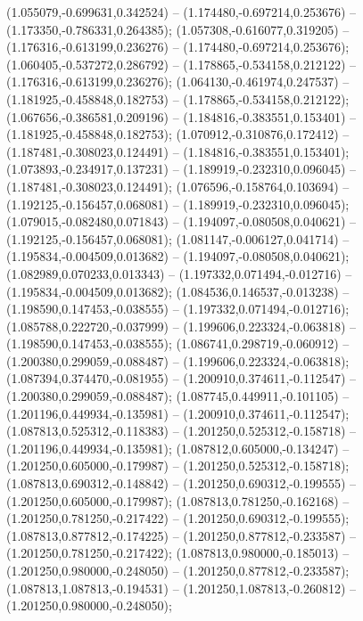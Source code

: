  (1.055079,-0.699631,0.342524) -- (1.174480,-0.697214,0.253676) -- (1.173350,-0.786331,0.264385);
 (1.057308,-0.616077,0.319205) -- (1.176316,-0.613199,0.236276) -- (1.174480,-0.697214,0.253676);
 (1.060405,-0.537272,0.286792) -- (1.178865,-0.534158,0.212122) -- (1.176316,-0.613199,0.236276);
 (1.064130,-0.461974,0.247537) -- (1.181925,-0.458848,0.182753) -- (1.178865,-0.534158,0.212122);
 (1.067656,-0.386581,0.209196) -- (1.184816,-0.383551,0.153401) -- (1.181925,-0.458848,0.182753);
 (1.070912,-0.310876,0.172412) -- (1.187481,-0.308023,0.124491) -- (1.184816,-0.383551,0.153401);
 (1.073893,-0.234917,0.137231) -- (1.189919,-0.232310,0.096045) -- (1.187481,-0.308023,0.124491);
 (1.076596,-0.158764,0.103694) -- (1.192125,-0.156457,0.068081) -- (1.189919,-0.232310,0.096045);
 (1.079015,-0.082480,0.071843) -- (1.194097,-0.080508,0.040621) -- (1.192125,-0.156457,0.068081);
 (1.081147,-0.006127,0.041714) -- (1.195834,-0.004509,0.013682) -- (1.194097,-0.080508,0.040621);
 (1.082989,0.070233,0.013343) -- (1.197332,0.071494,-0.012716) -- (1.195834,-0.004509,0.013682);
 (1.084536,0.146537,-0.013238) -- (1.198590,0.147453,-0.038555) -- (1.197332,0.071494,-0.012716);
 (1.085788,0.222720,-0.037999) -- (1.199606,0.223324,-0.063818) -- (1.198590,0.147453,-0.038555);
 (1.086741,0.298719,-0.060912) -- (1.200380,0.299059,-0.088487) -- (1.199606,0.223324,-0.063818);
 (1.087394,0.374470,-0.081955) -- (1.200910,0.374611,-0.112547) -- (1.200380,0.299059,-0.088487);
 (1.087745,0.449911,-0.101105) -- (1.201196,0.449934,-0.135981) -- (1.200910,0.374611,-0.112547);
 (1.087813,0.525312,-0.118383) -- (1.201250,0.525312,-0.158718) -- (1.201196,0.449934,-0.135981);
 (1.087812,0.605000,-0.134247) -- (1.201250,0.605000,-0.179987) -- (1.201250,0.525312,-0.158718);
 (1.087813,0.690312,-0.148842) -- (1.201250,0.690312,-0.199555) -- (1.201250,0.605000,-0.179987);
 (1.087813,0.781250,-0.162168) -- (1.201250,0.781250,-0.217422) -- (1.201250,0.690312,-0.199555);
 (1.087813,0.877812,-0.174225) -- (1.201250,0.877812,-0.233587) -- (1.201250,0.781250,-0.217422);
 (1.087813,0.980000,-0.185013) -- (1.201250,0.980000,-0.248050) -- (1.201250,0.877812,-0.233587);
 (1.087813,1.087813,-0.194531) -- (1.201250,1.087813,-0.260812) -- (1.201250,0.980000,-0.248050);
